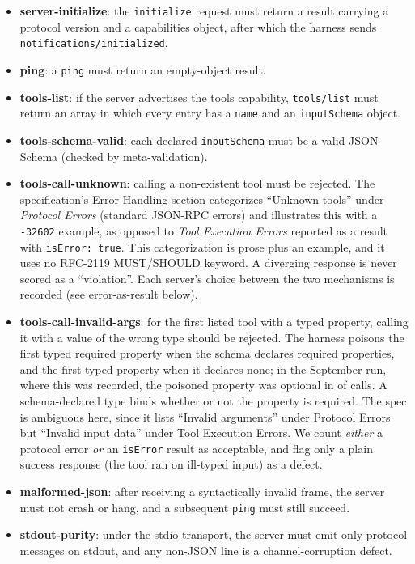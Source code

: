 \begin{itemize}
  \item \textbf{server-initialize}: the \texttt{initialize} request must return a
    result carrying a protocol version and a capabilities object, after which the
    harness sends \texttt{notifications/initialized}.
  \item \textbf{ping}: a \texttt{ping} must return an empty-object result.
  \item \textbf{tools-list}: if the server advertises the tools capability,
    \texttt{tools/list} must return an array in which every entry has a
    \texttt{name} and an \texttt{inputSchema} object.
  \item \textbf{tools-schema-valid}: each declared \texttt{inputSchema} must be a
    valid JSON Schema (checked by meta-validation).
  \item \textbf{tools-call-unknown}: calling a non-existent tool must be rejected.
    The specification's Error Handling section categorizes ``Unknown tools'' under
    \emph{Protocol Errors} (standard JSON-RPC errors) and illustrates this with a
    \texttt{-32602} example, as opposed to \emph{Tool Execution Errors} reported as
    a result with \texttt{isError: true}. This categorization is prose plus an
    example, and it uses no RFC-2119 \textsf{MUST}/\textsf{SHOULD} keyword. A
    diverging response is never scored as a ``violation''. Each server's choice
    between the two mechanisms is recorded (see \textsf{error-as-result} below).
  \item \textbf{tools-call-invalid-args}: for the first listed tool with a typed
    property, calling it with a value of the wrong type should be rejected. The
    harness poisons the first typed required property when the schema declares
    required properties, and the first typed property when it declares none; in the September run, where this was recorded, the
    poisoned property was optional in \PoisonOptionalPct{} of calls. A schema-declared
    type binds whether or not the property is required. The spec is
    ambiguous here, since it lists ``Invalid arguments'' under Protocol Errors
    but ``Invalid input data'' under Tool Execution Errors. We count \emph{either} a
    protocol error \emph{or} an \texttt{isError} result as acceptable, and flag only
    a plain success response (the tool ran on ill-typed input) as a defect.
  \item \textbf{malformed-json}: after receiving a syntactically invalid frame, the
    server must not crash or hang, and a subsequent \texttt{ping} must still succeed.
  \item \textbf{stdout-purity}: under the stdio transport, the server must emit only
    protocol messages on stdout, and any non-JSON line is a channel-corruption defect.
\end{itemize}

